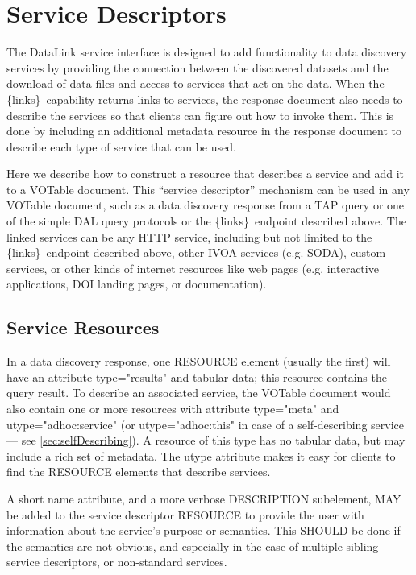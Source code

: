 \documentclass[11pt,a4paper]{ivoa}
\newcommand{\blinks}{\{links\}}
\newcommand{\attval}[2]{#1={\allowbreak}{"}#2{"}}
\begin{document}
\section{Service Descriptors}
\label{sec:serviceDescriptors}

The DataLink service interface is designed to add functionality to data
discovery services by providing the connection between the discovered
datasets and the download of data files and access to services that act
on the data. When the \blinks\ capability returns links to services, the
response document also needs to describe the services so that clients can
figure out how to invoke them. This is done by including an additional
metadata resource in the response document to describe each type of
service that can be used.

Here we describe how to construct a resource that describes a service
and add it to a VOTable document. This ``service descriptor'' mechanism can
be used in any VOTable document, such as a data discovery response from a TAP query
or one of the simple DAL query protocols or the \blinks\ endpoint described above.
The linked services can be any HTTP service, including but not limited to the \blinks\
endpoint described above, other IVOA services (e.g. SODA), custom services, or other
kinds of internet resources like web pages (e.g. interactive applications, DOI landing
pages, or documentation).

\subsection{Service Resources}
\label{sec:serviceResources}

In a data discovery response, one RESOURCE element (usually the first)
will have an attribute \attval{type}{results} and tabular data; this resource
contains the query result. To describe an associated service, the VOTable document
would also contain one or more resources with attribute \attval{type}{meta} and
\attval{utype}{adhoc:service}  (or \attval{utype}{adhoc:this} in case of
a self-describing service --- see \ref{sec:selfDescribing}). A resource of this
type has no tabular data, but may include a rich set of metadata. The utype attribute
makes it easy for clients to find the RESOURCE elements that describe services.

A short name attribute, and a more verbose DESCRIPTION  subelement,
MAY be added to the service descriptor RESOURCE to  provide the user
with information about the service's purpose or  semantics. This SHOULD
be done if the semantics are not obvious,  and especially in the case
of multiple sibling service  descriptors, or non-standard services.
\end{document}
